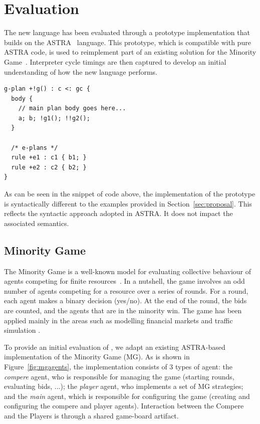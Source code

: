 \section{Evaluation}
\label{sec:evaluation}
The new language has been evaluated through a prototype implementation that builds on 
the ASTRA~\cite{DBLP:conf/prima/CollierRL15} language. This prototype, which is compatible
with pure ASTRA code, is used to reimplement part of an existing solution for the Minority 
Game~\cite{moro2004minority}. Interpreter cycle timings are then captured to develop an initial
understanding of how the new language performs.

{\small
\begin{verbatim}
g-plan +!g() : c <: gc { 
  body {
    // main plan body goes here...
    a; b; !g1(); !!g2();
  }

  /* e-plans */
  rule +e1 : c1 { b1; }
  rule +e2 : c2 { b2; }
}
\end{verbatim}}

As can be seen in the  snippet of code above, the implementation of the {\aser} prototype is 
syntactically different to the examples provided in Section~\ref{sec:proposal}. This reflects 
the syntactic approach adopted in ASTRA. It does not impact the associated semantics.

\subsection{Minority Game}
\label{minority}
The Minority Game is a well-known model for evaluating collective behaviour of agents competing 
for finite resources~\cite{moro2004minority}. In a nutshell, the game involves an odd number of
agents competing for a resource over a series of rounds. For a round, each agent makes a binary
decision (yes/no). At the end of the round, the bids are counted, and the agents that are in the
minority win. The game has been applied mainly in the areas such as modelling financial markets 
\cite{challet2013minority} and traffic simulation \cite{chmura2004minority}.

To provide an initial evaluation of {\aser}, we adapt an existing ASTRA-based implementation of 
the Minority Game (MG). As is shown in Figure~\ref{fig:mgagents}, the implementation consists of
3 types of agent: the \emph{compere} agent, who is responsible for managing the game (starting 
rounds, evaluating bids, ...); the \emph{player} agent, who implements a set of MG strategies; 
and the \emph{main} agent, which is responsible for configuring the game (creating and configuring
the compere and player agents). Interaction between the Compere and the Players is through a shared 
game-board artifact.

